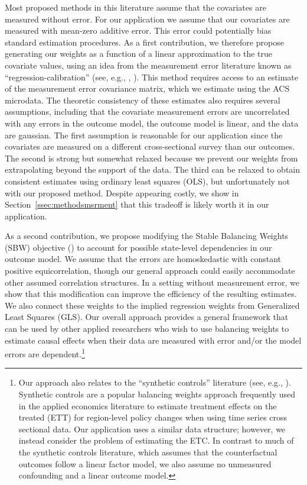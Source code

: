 \documentclass[aoas]{imsart}
\theoremstyle{plain}
\theoremstyle{remark}
\begin{document}
Most proposed methods in this literature assume that the covariates are measured without error. For our application we assume that our covariates are measured with mean-zero additive error. This error could potentially bias standard estimation procedures. As a first contribution, we therefore propose generating our weights as a function of a linear approximation to the true covariate values, using an idea from the measurement error literature known as ``regression-calibration'' (see, e.g., \cite{carroll2006measurement}, \cite{gleser1992importance}). This method requires access to an estimate of the measurement error covariance matrix, which we estimate using the ACS microdata. The theoretic consistency of these estimates also requires several assumptions, including that the covariate measurement errors are uncorrelated with any errors in the outcome model, the outcome model is linear, and the data are gaussian. The first assumption is reasonable for our application since the covariates are measured on a different cross-sectional survey than our outcomes. The second is strong but somewhat relaxed because we prevent our weights from extrapolating beyond the support of the data. The third can be relaxed to obtain consistent estimates using ordinary least squares (OLS), but unfortunately not with our proposed method. Despite appearing costly, we show in Section~\ref{ssec:methodsmsrment} that this tradeoff is likely worth it in our application.

As a second contribution, we propose modifying the Stable Balancing Weights (SBW) objective (\cite{zubizarreta2015stable}) to account for possible state-level dependencies in our outcome model. We assume that the errors are homoskedastic with constant positive equicorrelation, though our general approach could easily accommodate other assumed correlation structures. In a setting without measurement error, we show that this modification can improve the efficiency of the resulting estimates. We also connect these weights to the implied regression weights from Generalized Least Squares (GLS). Our overall approach provides a general framework that can be used by other applied researchers who wish to use balancing weights to estimate causal effects when their data are measured with error and/or the model errors are dependent.\footnote{Our approach also relates to the ``synthetic controls'' literature (see, e.g., \cite{abadie2010synthetic}). Synthetic controls are a popular balancing weights approach frequently used in the applied economics literature to estimate treatment effects on the treated (ETT) for region-level policy changes when using time series cross sectional data. Our application uses a similar data structure; however, we instead consider the problem of estimating the ETC. In contrast to much of the synthetic controls literature, which assumes that the counterfactual outcomes follow a linear factor model, we also assume no unmeasured confounding and a linear outcome model.}
\end{document}
